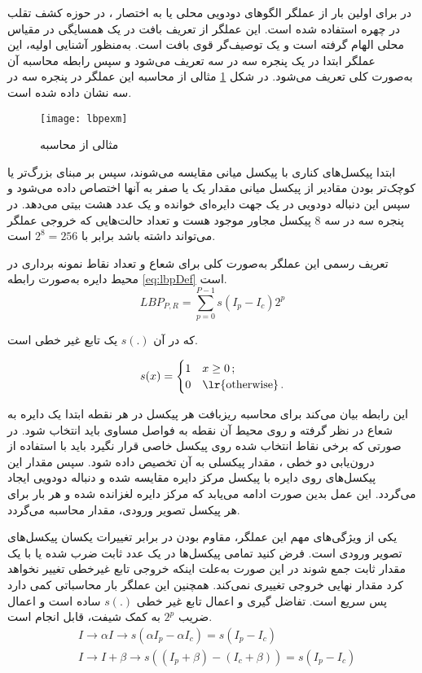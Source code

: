 در 
\cite{maatta2011face}
برای اولین بار از عملگر الگوهای دودویی محلی یا به اختصار ، در حوزه کشف تقلب در چهره استفاده شده است. این عملگر از تعریف بافت در یک همسایگی در مقیاس محلی الهام گرفته است و یک توصیف‌گر قوی بافت است. به‌منظور آشنایی اولیه، این عملگر ابتدا در یک پنجره سه در سه تعریف می‌شود و سپس رابطه محاسبه آن به‌صورت کلی تعریف می‌شود. در شکل 
\ref{fig:lbpexm}
مثالی از محاسبه این عملگر در پنجره سه در سه نشان داده شده است.

\begin{figure}[ht]
	\centerline{\texttt{[image: lbpexm]}}
	\caption{مثالی از محاسبه  \cite{maatta2011face}}
	\label{fig:lbpexm}
\end{figure}
ابتدا پیکسل‌های کناری با پیکسل میانی مقایسه می‌شوند، سپس بر مبنای بزرگ‌تر یا کوچک‌تر بودن مقادیر از پیکسل میانی مقدار یک یا صفر به آنها اختصاص داده می‌شود و سپس این دنباله دودویی در یک جهت دایره‌ای خوانده و یک عدد هشت بیتی می‌دهد. در پنجره سه در سه 8 پیکسل مجاور موجود هست و تعداد حالت‌هایی که خروجی عملگر می‌تواند داشته باشد برابر با
$2^8=256$
است.





تعریف رسمی این عملگر به‌صورت کلی برای شعاع  و تعداد نقاط نمونه برداری  در محیط دایره به‌صورت رابطه
\ref{eq:lbpDef}
است.
\begin{equation}\label{eq:lbpDef}
			LBP_{P,R}=\sum_{p=0}^{P-1}s(I_p-I_c)2^p 
\end{equation}

که در آن
$s(.)$
یک تابع غیر خطی است.

\[ s(x) = 
\begin{cases} 1  & \text{$x \geq 0 $}\,; \\
	0  & \text{\lr{otherwise}}\,.
\end{cases} \]


این رابطه بیان می‌کند برای محاسبه ریزبافت هر پیکسل در هر نقطه ابتدا یک دایره به شعاع  در نظر گرفته و روی محیط آن  نقطه به فواصل مساوی باید انتخاب شود. در صورتی که برخی نقاط انتخاب شده روی پیکسل خاصی قرار نگیرد باید با استفاده از درون‌یابی دو خطی
، مقدار پیکسلی به آن تخصیص داده شود. سپس مقدار این پیکسل‌های روی دایره با پیکسل مرکز دایره مقایسه شده و دنباله دودویی ایجاد می‌گردد. این عمل بدین صورت ادامه می‌یابد که مرکز دایره لغزانده شده و هر بار برای هر پیکسل تصویر ورودی، مقدار  محاسبه می‌گردد.

یکی از ویژگی‌های مهم این عملگر، مقاوم بودن در برابر تغییرات یکسان پیکسل‌های تصویر ورودی است. فرض کنید تمامی پیکسل‌ها در یک عدد ثابت ضرب شده یا با یک مقدار ثابت جمع شوند در این صورت به‌علت اینکه خروجی تابع غیرخطی تغییر نخواهد کرد مقدار نهایی خروجی  تغییری نمی‌کند.
همچنین این عملگر بار محاسباتی کمی دارد پس سریع است. تفاضل گیری و اعمال تابع غیر خطی   
$s(.)$
ساده است و اعمال ضریب
$2^p$
به کمک شیفت، قابل انجام است.
\begin{align}\label{eq:lbpfeature}
	&I \to \alpha I \to s(\alpha I_p -\alpha I_c) = s(I_p - I_c) \\
	&I \to I+\beta \to s((I_p + \beta)-(I_c + \beta)) = s(I_p - I_c ) 
\end{align}

